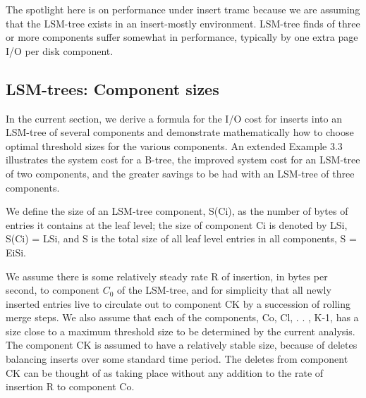 \documentclass[a4paper,12pt,notitlepage,twoside,openright]{article}
\begin{document}
The spotlight here is on performance under insert tramc because we are
assuming that the LSM-tree exists in an insert-mostly environment.
LSM-tree finds of three or more components suffer somewhat in
performance, typically by one extra page I/O per disk component.


\hypertarget{lsm-trees-component-sizes}{%
\subsection{LSM-trees: Component
sizes}\label{lsm-trees-component-sizes}}


In the current section, we derive a formula for the I/O cost for inserts
into an LSM-tree of several components and demonstrate mathematically
how to choose optimal threshold sizes for the various components. An
extended Example 3.3 illustrates the system cost for a B-tree, the
improved system cost for an LSM-tree of two components, and the greater
savings to be had with an LSM-tree of three components.

We define the size of an LSM-tree component, S(Ci), as the number of
bytes of entries it contains at the leaf level; the size of component Ci
is denoted by LSi, S(Ci) = LSi, and S is the total size of all leaf
level entries in all components, S = EiSi.

We assume there is some relatively steady rate R of insertion, in bytes
per second, to component \(C_0\) of the LSM-tree, and for simplicity that all
newly inserted entries live to circulate out to component CK by a
succession of rolling merge steps. We also assume that each of the
components, Co, Cl, . . , K-1, has a size close to a maximum threshold
size to be determined by the current analysis. The component CK is
assumed to have a relatively stable size, because of deletes balancing
inserts over some standard time period. The deletes from component CK
can be thought of as taking place without any addition to the rate of
insertion R to component Co.
\end{document}
